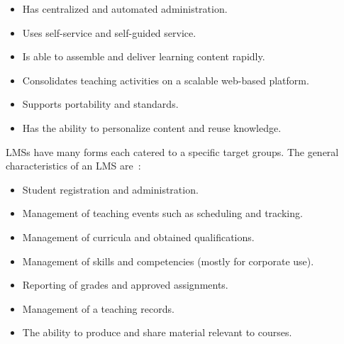 \begin{itemize}
	\item Has centralized and automated administration.
	\item Uses self-service and self-guided service.
	\item Is able to assemble and deliver learning content rapidly.
	\item Consolidates teaching activities on a scalable web-based platform.
	\item Supports portability and standards.
	\item Has the ability to personalize content and reuse knowledge.
\end{itemize}

LMSs have many forms each catered to a specific target groups. 
The general characteristics of an LMS are~\citep{Kerschenbaum}:

\begin{itemize}
	\item Student registration and administration.
	\item Management of teaching events such as scheduling and tracking.
	\item Management of curricula and obtained qualifications.
	\item Management of skills and competencies (mostly for corporate use).
	\item Reporting of grades and approved assignments.
	\item Management of	a teaching records.
	\item The ability to produce and share material relevant to courses.

\end{itemize}

